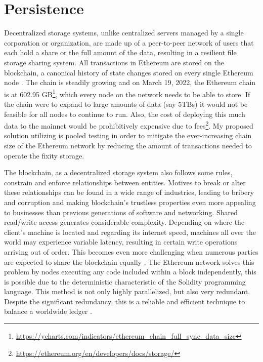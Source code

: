 \documentclass[final]{vutinfth}
\begin{document}
\section{Persistence}\label{sec:persistence}
Decentralized storage systems, unlike centralized servers managed by a single corporation or organization, are made up of a peer-to-peer network of users that each hold a share or the full amount of the data, resulting in a resilient file storage sharing system. All transactions in Ethereum are stored on the blockchain, a canonical history of state changes stored on every single Ethereum node \cite[12]{dannen2017introducing}. 
The chain is steadily growing and on March 19, 2022, the Ethereum chain is at 602.95 GB\footnote{\url{https://ycharts.com/indicators/ethereum_chain_full_sync_data_size}}, which every node on the network needs to be able to store. If the chain were to expand to large amounts of data (say 5TBs) it would not be feasible for all nodes to continue to run. Also, the cost of deploying this much data to the mainnet would be prohibitively expensive due to fees\footnote{\url{https://ethereum.org/en/developers/docs/storage/}}.
My proposed solution utilizing is pooled testing in order to mitigate the ever-increasing chain size of the Ethereum network by reducing the amount of transactions needed to operate the fixity storage. 

The blockchain, as a decentralized storage system also follows some rules, constrain and enforce relationships between entities. Motives to break or alter these relationships can be found in a wide range of industries, leading to bribery and corruption and making blockchain's trustless properties even more appealing to businesses than previous generations of software and networking. Shared read/write access generates considerable complexity. Depending on where the client's machine is located and regarding its internet speed, machines all over the world may experience variable latency, resulting in certain write operations arriving out of order. This becomes even more challenging when numerous parties are expected to share the blockchain equally \cite[20]{dannen2017introducing}. The Ethereum network solves this problem by nodes executing any code included within a block independently, this is possible due to the deterministic characteristic of the Solidity programming language. This method is not only highly parallelized, but also very redundant. Despite the significant redundancy, this is a reliable and efficient technique to balance a worldwide ledger \cite[50]{dannen2017introducing}.
\end{document}
